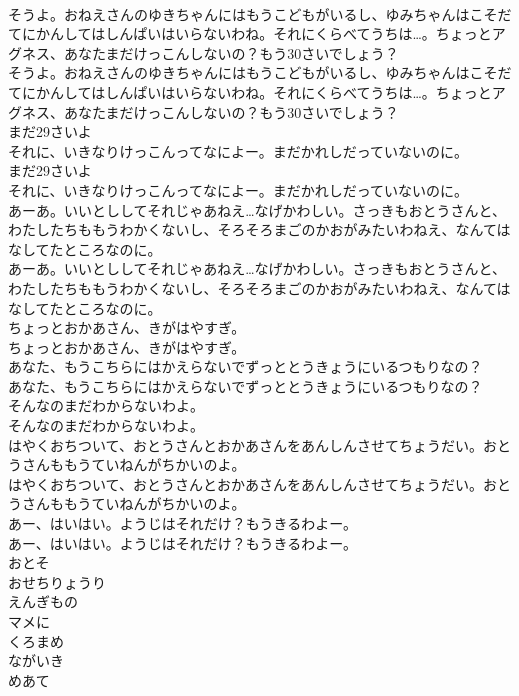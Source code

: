 \documentclass[8pt]{extreport}
\begin{document}
\begin{CJK}{UTF8}{min}
\\	そうよ。おねえさんのゆきちゃんにはもうこどもがいるし、ゆみちゃんはこそだてにかんしてはしんぱいはいらないわね。それにくらべてうちは…。ちょっとアグネス、あなたまだけっこんしないの？もう30さいでしょう？
\\	そうよ。おねえさんのゆきちゃんにはもうこどもがいるし、ゆみちゃんはこそだてにかんしてはしんぱいはいらないわね。それにくらべてうちは…。ちょっとアグネス、あなたまだけっこんしないの？もう30さいでしょう？
\\	まだ29さいよ
\\	それに、いきなりけっこんってなによー。まだかれしだっていないのに。
\\	まだ29さいよ
\\	それに、いきなりけっこんってなによー。まだかれしだっていないのに。
\\	あーあ。いいとししてそれじゃあねえ…なげかわしい。さっきもおとうさんと、わたしたちももうわかくないし、そろそろまごのかおがみたいわねえ、なんてはなしてたところなのに。
\\	あーあ。いいとししてそれじゃあねえ…なげかわしい。さっきもおとうさんと、わたしたちももうわかくないし、そろそろまごのかおがみたいわねえ、なんてはなしてたところなのに。
\\	ちょっとおかあさん、きがはやすぎ。
\\	ちょっとおかあさん、きがはやすぎ。
\\	あなた、もうこちらにはかえらないでずっととうきょうにいるつもりなの？
\\	あなた、もうこちらにはかえらないでずっととうきょうにいるつもりなの？
\\	そんなのまだわからないわよ。
\\	そんなのまだわからないわよ。
\\	はやくおちついて、おとうさんとおかあさんをあんしんさせてちょうだい。おとうさんももうていねんがちかいのよ。
\\	はやくおちついて、おとうさんとおかあさんをあんしんさせてちょうだい。おとうさんももうていねんがちかいのよ。
\\	あー、はいはい。ようじはそれだけ？もうきるわよー。
\\	あー、はいはい。ようじはそれだけ？もうきるわよー。
\\	おとそ
\\	おせちりょうり
\\	えんぎもの
\\	マメに
\\	くろまめ
\\	ながいき
\\	めあて

\end{CJK}
\end{document}
